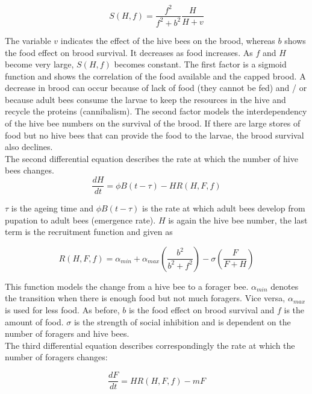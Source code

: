 	\begin{equation}\label{eq:functionHiveBeesFood}
		S(H,f)=\frac{f^2}{f^2+b^2}\frac{H}{H+v}
	\end{equation}
	
	The variable $v$ indicates the effect of the hive bees on the brood, whereas $b$ shows the food effect on brood survival. It decreases as food increases. As $f$ and $H$ become very large, $S(H,f)$ becomes constant. The first factor is a sigmoid function and shows the correlation of the food available and the capped brood. A decrease in brood can occur because of lack of food (they cannot be fed) and / or because adult bees consume the larvae to keep the resources in the hive and recycle the proteins (cannibalism). The second factor models the interdependency of the hive bee numbers on the survival of the brood. If there are large stores of food but no hive bees that can provide the food to the larvae, the brood survival also declines.  
	\\
	The second differential equation describes the rate at which the number of hive bees changes.	
	\begin{equation}\label{eq:changeHiveBees}
		\frac{dH}{dt}=\phi B(t-\tau)-HR(H,F,f)
	\end{equation}
	
	$\tau$ is the ageing time and $\phi B(t-\tau)$ is the rate at which adult bees develop from pupation to adult bees (emergence rate). $H$ is again the hive bee number, the last term is the recruitment function and given as
		
		\begin{equation}\label{eq:recruitmentFunction}
			R(H,F,f) = \alpha_{min} + \alpha_{max}(\frac{b^2}{b^2+f^2})-\sigma(\frac{F}{F+H})
		\end{equation}
				
	This function models the change from a hive bee to a forager bee. $\alpha_{min}$ denotes the transition when there is enough food but not much foragers. Vice versa, $\alpha_{max}$ is used for less food. As before, $b$ is the food effect on brood survival and $f$ is the amount of food. $\sigma$ is the strength of social inhibition and is dependent on the number of foragers and hive bees.\\
	The third differential equation describes correspondingly the rate at which the number of foragers changes:
	
	\begin{equation}\label{eq:changeForagers}
		\frac{dF}{dt} = HR(H,F,f)-m F
	\end{equation}
	
